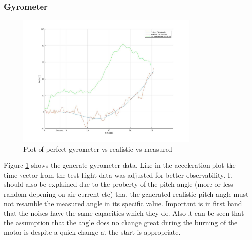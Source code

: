 \subsubsection{Gyrometer}
\begin{figure}[h!]
 \centering
 \includegraphics[width=0.8\textwidth]{./Pictures/PitchPerfVSReal.jpg}
 \caption{Plot of perfect gyrometer vs realistic vs measured}
 \label{fig:PtichPerVSReal}
\end{figure}
Figure \ref{fig:PtichPerVSReal} shows the generate gyrometer data.
Like in the acceleration plot the time vector from the test flight data was adjusted for better observability.
It should also be explained due to the proberty of the pitch angle (more or less random depening on air current etc) 
that the generated realistic pitch angle must not resamble the measured angle in its specific value.
Important is in first hand that the noises have the same capacities which they do.
Also it can be seen that the assumption that the angle does no change great during the burning of the motor is despite a quick change at the start is appropriate.

\newpage
